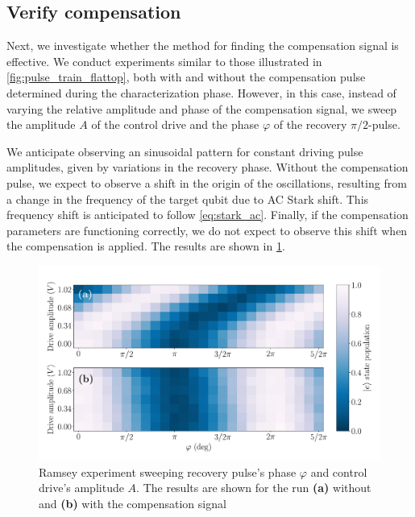 \subsection{Verify compensation}

Next, we investigate whether the method for finding the compensation signal is effective.
We conduct experiments similar to those illustrated in \cref{fig:pulse_train_flattop}, both with and without the compensation pulse determined during the characterization phase.
However, in this case, instead of varying the relative amplitude and phase of the compensation signal, we sweep the amplitude $A$ of the control drive and the phase $\varphi$ of the recovery $\pi / 2$-pulse.

We anticipate observing an sinusoidal pattern for constant driving pulse amplitudes, given by variations in the recovery phase.
Without the compensation pulse, we expect to observe a shift in the origin of the oscillations, resulting from a change in the frequency of the target qubit due to AC Stark shift.
This frequency shift is anticipated to follow \cref{eq:stark_ac}. 
Finally, if the compensation parameters are functioning correctly, we do not expect to observe this shift when the compensation is applied.
The results are shown in \cref{fig:Ramsey_cancellation}.

\begin{figure}
    \centering
    \includegraphics[width=1\linewidth]{Images/Chap2.0/Ramsey_cancellatoin.pdf}
    \vspace{-1cm}
    \caption{Ramsey experiment sweeping recovery pulse's phase $\varphi$ and control drive's amplitude $A$. The results are shown for the run \textbf{(a)} without and \textbf{(b)} with the compensation signal}
    \label{fig:Ramsey_cancellation}
\end{figure}

